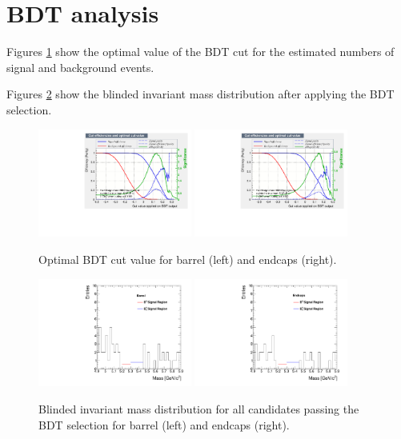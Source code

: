 
\section{BDT analysis}

Figures \ref{fig:massOptimalCut} show the optimal value of the BDT cut for the estimated numbers of signal and background
events.

Figures \ref{fig:massPlotBlinded} show the blinded invariant mass distribution after applying the BDT selection.

\begin{figure}
  \centering
  \includegraphics[width=0.45\textwidth]{Figures/mvaeffs_BDT_barrel.pdf}
  \includegraphics[width=0.45\textwidth]{Figures/mvaeffs_BDT_endcaps.pdf}
  \caption{Optimal BDT cut value for barrel (left) and endcaps (right).}
  \label{fig:massOptimalCut}
\end{figure}

\begin{figure}
  \centering
  \includegraphics[width=0.45\textwidth]{Figures/BarrelMassPlot.pdf}
  \includegraphics[width=0.45\textwidth]{Figures/EndcapsMassPlot.pdf}
  \caption{Blinded invariant mass distribution for all candidates passing the BDT selection for barrel (left) and endcaps (right).}
  \label{fig:massPlotBlinded}
\end{figure}

